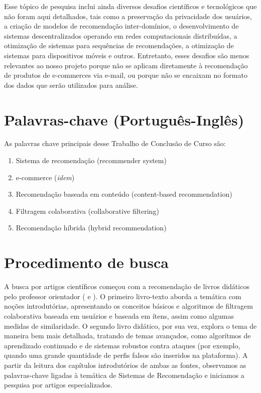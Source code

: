 Esse tópico de pesquisa inclui ainda diversos desafios científicos e tecnológicos que não foram aqui detalhados, tais como a preservação da privacidade dos usuários, a criação de modelos de recomendação inter-domínios, o desenvolvimento de sistemas descentralizados operando em redes computacionais distribuídas, a otimização de sistemas para sequências de recomendações, a otimização de sistemas para dispositivos móveis e outros. Entretanto, esses desafios são menos relevantes ao nosso projeto porque não se aplicam diretamente à recomendação de produtos de e-commerces via e-mail, ou porque não se encaixam no formato dos dados que serão utilizados para análise. 

\section{Palavras-chave (Português-Inglês)} %
\label{sec:palavras_chave_portugu_s_ingl_s_}

As palavras chave principais desse Trabalho de Conclusão de Curso são:

\begin{enumerate}
\item Sistema de recomendação (recommender system)
\item e-commerce (\textit{idem})
\item Recomendação baseada em conteúdo (content-based recommendation)
\item Filtragem colaborativa (collaborative filtering)
\item Recomendação híbrida (hybrid recommendation)
\end{enumerate}


\section{Procedimento de busca} %
\label{sec:procedimento_de_busca}

A busca por artigos científicos começou com a recomendação de livros didáticos pelo professor orientador (\cite{collectiveintelligence} e \cite{lops2011content}). O primeiro livro-texto aborda a temática com noções introdutórias, apresentando os conceitos básicos e algoritmos de filtragem colaborativa baseada em usuários e baseada em ítens, assim como algumas medidas de similaridade. O segundo livro didático, por sua vez, explora o tema de maneira bem mais detalhada, tratando de temas avançados, como algorítmos de aprendizado continuado e de sistemas robustos contra ataques (por exemplo, quando uma grande quantidade de perfis falsos são inseridos na plataforma). A partir da leitura dos capítulos introdutórios de ambas as fontes, observamos as palavras-chave ligadas à temática de Sistemas de Recomendação e iniciamos a pesquisa por artigos especializados.

